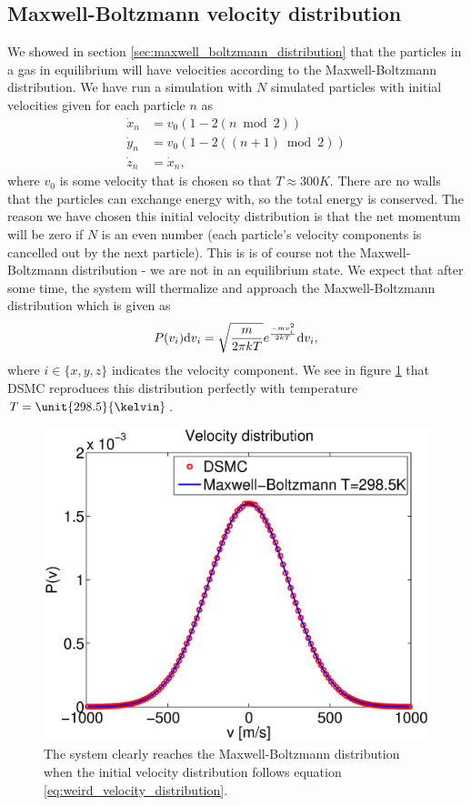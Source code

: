 \subsection{Maxwell-Boltzmann velocity distribution}
We showed in section \ref{sec:maxwell_boltzmann_distribution} that the particles in a gas in equilibrium will have velocities according to the Maxwell-Boltzmann distribution. We have run a simulation with $N$ simulated particles with initial velocities given for each particle $n$ as
\begin{align}
	\nonumber
	\dot x_n &= v_0(1 - 2 (n\bmod 2))\\
	\label{eq:weird_velocity_distribution}
	\dot y_n &= v_0(1 - 2 ((n+1)\bmod 2))\\
	\nonumber
	\dot z_n &= \dot x_n,
\end{align}
where $v_0$ is some velocity that is chosen so that $T\approx 300K$. There are no walls that the particles can exchange energy with, so the total energy is conserved. The reason we have chosen this initial velocity distribution is that the net momentum will be zero if $N$ is an even number (each particle's velocity components is cancelled out by the next particle). This is is of course not the Maxwell-Boltzmann distribution - we are not in an equilibrium state. We expect that after some time, the system will thermalize and approach the Maxwell-Boltzmann distribution which is given as
\begin{align}
	P(v_i)\mathrm{d}v_i = \sqrt{m\over 2\pi kT}e^{-mv_i^2\over 2kT}\mathrm{d}v_i,
\end{align}
where $i\in \{x,y,z\}$ indicates the velocity component. We see in figure \ref{fig:velocity_distribution} that DSMC reproduces this distribution perfectly with temperature $T=\unit{298.5}{\kelvin}$. 
\begin{figure}[h]
\begin{center}
\includegraphics[width=\textwidth, trim=0cm 0cm 0cm 0cm, clip]{DSMC/figures/velocity_distribution.eps}
\end{center}
\caption{The system clearly reaches the Maxwell-Boltzmann distribution when the initial velocity distribution follows equation \ref{eq:weird_velocity_distribution}. }
\label{fig:velocity_distribution}
\end{figure}
